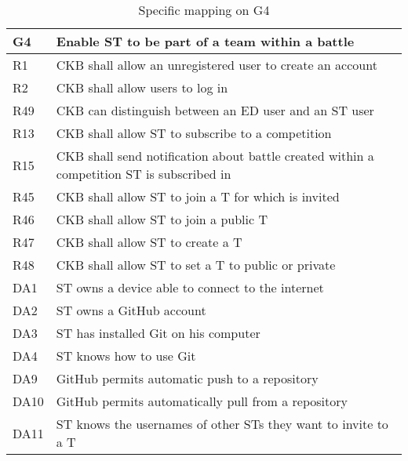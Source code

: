   \begin{table}[H]
    \begin{longtable}{|l|p{12cm}|}
      \hline
      \textbf{G4} & \textbf{Enable ST to be part of a team within a battle}      \\
      \hline
      R1 & CKB shall allow an unregistered user to create an account \\
      \hline
      R2 & CKB shall allow users to log in \\
      \hline
      R49 & CKB can distinguish between an ED user and an ST user \\
      \hline
      R13 & CKB shall allow ST to subscribe to a competition \\
      \hline
      R15 & CKB shall send notification about battle created within a competition ST is subscribed in \\
      \hline
      R45 & CKB shall allow ST to join a T for which is invited \\
      \hline
      R46 & CKB shall allow ST to join a public T \\
      \hline
      R47 & CKB shall allow ST to create a T \\
      \hline
      R48 & CKB shall allow ST to set a T to public or private \\
      \hline
      DA1 & ST owns a device able to connect to the internet \\
      \hline
      DA2 & ST owns a GitHub account \\
      \hline
      DA3 & ST has installed Git on his computer \\
      \hline
      DA4 & ST knows how to use Git \\
      \hline
      DA9 & GitHub permits automatic push to a repository \\
      \hline
      DA10 & GitHub permits automatically pull from a repository \\
      \hline
      DA11 & ST knows the usernames of other STs they want to invite to a T \\
      \hline
    \end{longtable}
    \caption{Specific mapping on G4}
    \label{tab:mappingG4}
  \end{table}


